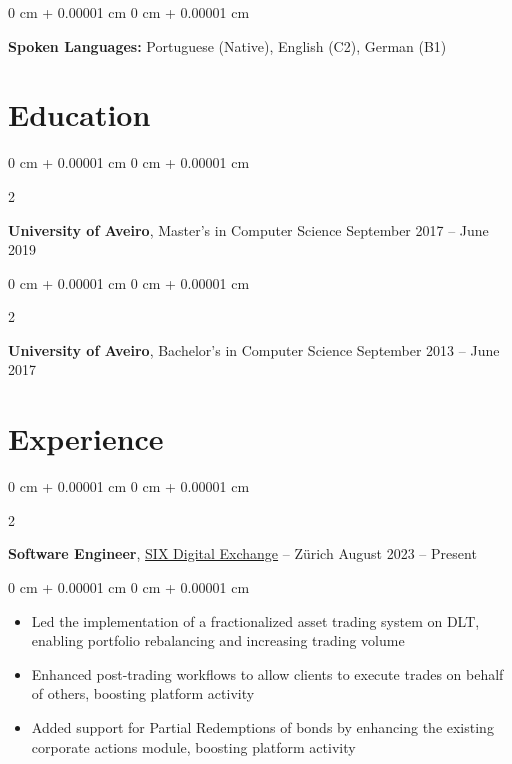 \documentclass[10pt, letterpaper]{article}
\newenvironment{highlights}{
    \begin{itemize}[
        topsep=0.10 cm,
        parsep=0.10 cm,
        partopsep=0pt,
        itemsep=0pt,
        leftmargin=0 cm + 10pt
    ]
}{
    \end{itemize}
} %
\newenvironment{onecolentry}{
    \begin{adjustwidth}{
        0 cm + 0.00001 cm
    }{
        0 cm + 0.00001 cm
    }
}{
    \end{adjustwidth}
} %
\newenvironment{twocolentry}[2][]{
    \onecolentry
    \def\secondColumn{#2}
    \setcolumnwidth{\fill, 4.5 cm}
    \begin{paracol}{2}
}{
    \switchcolumn \raggedleft \secondColumn
    \end{paracol}
    \endonecolentry
} %
\begin{document}
        \vspace{0.1 cm}
        
        \begin{onecolentry}
            \textbf{Spoken Languages:} Portuguese (Native), English (C2), German (B1)
        \end{onecolentry}

    \section{Education}
        
        \begin{twocolentry}{
            September 2017 – June 2019
        }
            \textbf{University of Aveiro}, Master's in Computer Science\end{twocolentry}

        \vspace{0.1 cm}

        \begin{twocolentry}{
            September 2013 – June 2017
        }
            \textbf{University of Aveiro}, Bachelor's in Computer Science\end{twocolentry}
    
    \section{Experience}
        
        \begin{twocolentry}{
            August 2023 – Present
        }
            \textbf{Software Engineer}, \href{https://www.sdx.com/}{SIX Digital Exchange} -- Zürich\end{twocolentry}

        \vspace{0.1 cm}
        \begin{onecolentry}
            \begin{highlights}
                \item Led the implementation of a fractionalized asset trading system on DLT, enabling portfolio rebalancing and increasing trading volume
                \item Enhanced post-trading workflows to allow clients to execute trades on behalf of others, boosting platform activity
                \item Added support for Partial Redemptions of bonds by enhancing the existing corporate actions module, boosting platform activity
            \end{highlights}
        \end{onecolentry}
\end{document}

